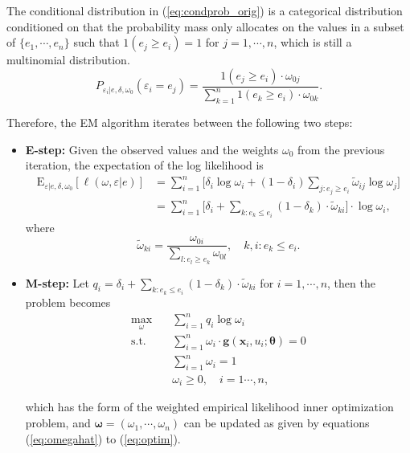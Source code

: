 \documentclass[article]{jss}
\newcommand{\xx}{\bm x}
\newcommand{\tth}{\bm \theta}
\newcommand{\oom}{\bm \omega}
\renewcommand{\gg}{\bm g}
\newcommand{\w}{\omega}
\renewcommand{\E}{\textrm{E}}
\newcommand{\e}{\varepsilon}
\renewcommand{\|}{\,|\,}
\begin{document}
The conditional distribution in (\ref{eq:condprob_orig}) is a categorical distribution conditioned on that the probability mass only allocates on the values in a subset of \(\{e_1,\cdots,e_n\}\) such that \(\mathfrak 1(e_j\geq e_i) = 1\) for \(j=1,\cdots,n\), which is still a multinomial distribution.
\begin{equation}\label{eq:condprob_orig}
  P_{\e_i|e,\delta,\w_0}(\e_i=e_j) =
  \frac{\mathfrak 1(e_j\geq e_i)\cdot \w_{0j}}{\sum_{k=1}^n\mathfrak 1(e_k\geq e_i)\cdot\w_{0k}}.
\end{equation}

Therefore, the EM algorithm iterates between the following two steps:

\begin{itemize}
\item \textbf{E-step:} Given the observed values and the weights $\w_0$ from the previous iteration, the expectation of the log likelihood is
\begin{equation}\label{eq:emestep}
\begin{split}
  \E_{\e|e,\delta,\w_0}[\ell(\w,\e|e)]
  &= \sum_{i=1}^n \Big[\delta_i \log \w_i +
    (1-\delta_i) \sum_{j: e_j\geq e_i} \tilde \w_{ij} \log \w_j\Big] \\
  &= \sum_{i=1}^n \Big[\delta_i + \sum_{k: e_k\leq e_i} (1-\delta_k)
      \cdot\tilde\w_{ki}\Big]\cdot\log \w_i,
\end{split}
\end{equation}
where
\[
  \tilde \w_{ki} = \frac{\w_{0i}}{\sum_{l: e_l\geq e_k}\w_{0l}}, \quad k,i: e_k\leq e_i.
\]

\item \textbf{M-step:}
Let $q_i = \delta_i + \sum_{k: e_k\leq e_i} (1-\delta_k)\cdot \tilde \w_{ki}$ for $i=1,\cdots,n$, then the problem becomes
\begin{equation}\label{eq:emmstep}
\begin{split}
  \max_{\w}\quad & \sum_{i=1}^n q_i \log \w_i \\
  \mbox{s.t.}\quad & \sum_{i=1}^n \w_i\cdot \gg(\xx_i,u_i;\tth) = 0 \\
  & \sum_{i=1}^n \w_i = 1 \\
  & \w_i \geq 0, \quad i=1\cdots,n,
\end{split}
\end{equation}

which has the form of the weighted empirical likelihood inner optimization problem, and $\oom = (\w_1,\cdots,\w_n)$ can be updated as given by equations (\ref{eq:omegahat}) to (\ref{eq:optim}).

\end{itemize}
\end{document}
